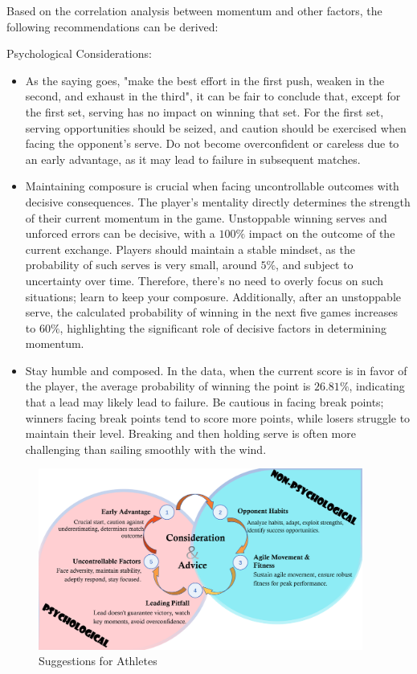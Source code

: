 Based on the correlation analysis between momentum and other factors, the following recommendations can be derived:



Psychological Considerations:
\begin{itemize}[label=\textbf{\normalsize$\bullet$}]
    \item As the saying goes, "make the best effort in the first push, weaken in the second, and exhaust in the third", it can be fair to conclude that, except for the first set, serving has no impact on winning that set.\cite{p321} For the first set, serving opportunities should be seized, and caution should be exercised when facing the opponent's serve. Do not become overconfident or careless due to an early advantage, as it may lead to failure in subsequent matches.
    \item Maintaining composure is crucial when facing uncontrollable outcomes with decisive consequences. The player's mentality directly determines the strength of their current momentum in the game. Unstoppable winning serves and unforced errors can be decisive, with a \(100\%\) impact on the outcome of the current exchange. Players should maintain a stable mindset, as the probability of such serves is very small, around \(5\%\), and subject to uncertainty over time. Therefore, there's no need to overly focus on such situations; learn to keep your composure. Additionally, after an unstoppable serve, the calculated probability of winning in the next five games increases to \(60\%\), highlighting the significant role of decisive factors in determining momentum.
    \item Stay humble and composed. In the data, when the current score is in favor of the player, the average probability of winning the point is \(26.81\%\), indicating that a lead may likely lead to failure. Be cautious in facing break points; winners facing break points tend to score more points, while losers struggle to maintain their level. Breaking and then holding serve is often more challenging than sailing smoothly with the wind.\cite{p322}
\end{itemize}

\begin{figure}[htbp]
    \centering
    \includegraphics[width=0.95\textwidth]{figure/memo.png}
    \caption{Suggestions for Athletes
    \textnormal{}}
\end{figure}

